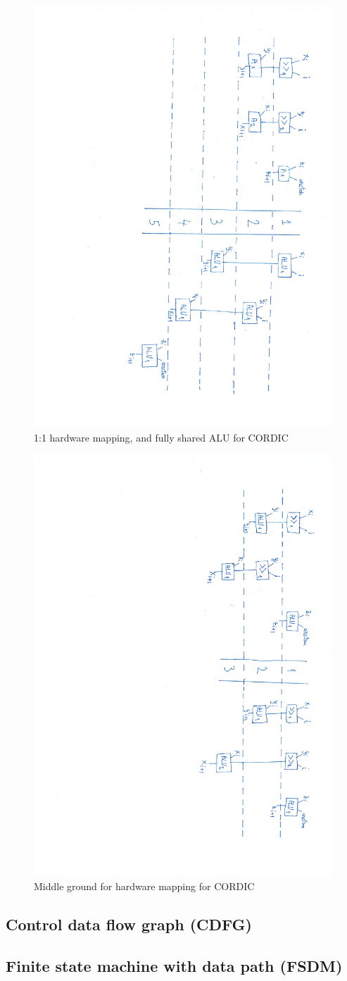 \documentclass[12pt, a4paper,oneside]{article}
\begin{document}
\begin{figure}[H]
	\centering
	\includegraphics[height = \textwidth,angle=91, trim=7cm 5cm 1.5cm 5cm]{schedules.pdf}
	\caption{1:1 hardware mapping, and fully shared ALU for CORDIC}
	\label{fig:schedules}
\end{figure}
	

\begin{figure}[H]
	\centering
	\includegraphics[height = \textwidth,angle=91, trim=7cm 5cm 1.5cm 5cm]{schedules_1.pdf}
	\caption{Middle ground for hardware mapping for CORDIC}
	\label{fig:schedules_1}
\end{figure}

\subsection{Control data flow graph (CDFG)}\label{ssec:cdfg}

\subsection{Finite state machine with data path (FSDM)}

\printbibliography
\end{document}
